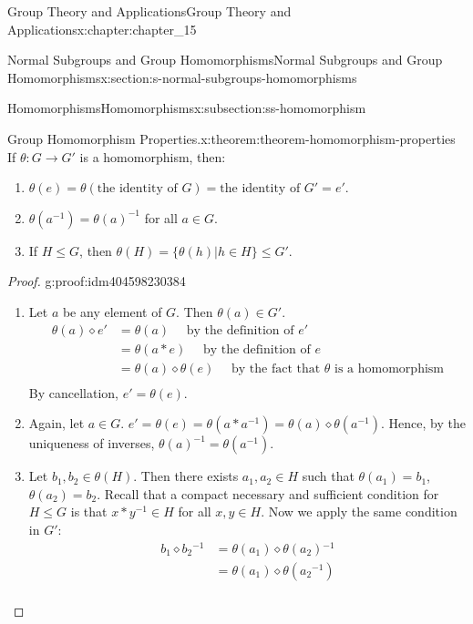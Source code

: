 \documentclass[twoside,10pt,]{book}
\numberwithin{equation}{section}
\begin{document}
\begin{chapterptx}{Group Theory and Applications}{}{Group Theory and Applications}{}{}{x:chapter:chapter_15}
\begin{sectionptx}{Normal Subgroups and Group Homomorphisms}{}{Normal Subgroups and Group Homomorphisms}{}{}{x:section:s-normal-subgroups-homomorphisms}
\begin{subsectionptx}{Homomorphisms}{}{Homomorphisms}{}{}{x:subsection:ss-homomorphism}
\begin{theorem}{Group Homomorphism Properties.}{}{x:theorem:theorem-homomorphism-properties}%
If \(\theta: G \rightarrow  G'\) is a homomorphism, then:%
\begin{enumerate}[label=(\alph*)]
\item{}\(\theta(e) =\theta(\textrm{the identity of } G) = \textrm{the identity of } G' = e'\).%
\item{}\(\theta\left(a ^{-1}\right) = \theta(a)^{-1}\) for all \(a \in  G\).%
\item{}If \(H \leq  G\), then \(\theta(H) = \{\theta(h) | h\in H\}\leq G'\).%
\end{enumerate}
%
\end{theorem}
\begin{proof}{}{g:proof:idm404598230384}
%
\begin{enumerate}[label=(\alph*)]
\item{}Let \(a\) be any element of \(G\). Then \(\theta(a) \in  G'\).%
\begin{equation*}
\begin{split}
\theta(a)\diamond e' &= \theta(a) \quad \textrm{     by the definition of } e'\\
&=\theta(a*e)\quad \textrm{     by the definition of } e\\
&= \theta(a)\diamond \theta(e)\quad \textrm{    by the fact that } \theta \textrm{ is a homomorphism}\\
\end{split}
\end{equation*}
By cancellation, \(e' = \theta(e)\).%
\item{}Again, let \(a \in G\). \(e' = \theta(e) = \theta\left(a*a^{-1} \right) = \theta(a)\diamond \theta\left(a^{-1}\right)\). Hence, by the uniqueness of inverses,  \(\theta(a) ^{-1}= \theta\left(a^{-1}\right)\).%
\item{}Let \(b_1, b_2 \in  \theta(H)\). Then there exists \(a_1, a_2\in H\) such that \(\theta\left(a_1\right) = b_1\), \(\theta\left(a_2\right) =
b_2\). Recall that a compact necessary and sufficient condition for \(H \leq  G\) is that \(x*y^{-1}\in H\)  for all \(x, y \in H\).  Now we apply the same condition in \(G'\):%
\begin{equation*}
\begin{split}
b_1\diamond b_2{}^{-1} &= \theta\left(a_1\right)\diamond \theta\left(a_2\right){}^{-1}\\
& =\theta\left(a_1\right)\diamond \theta\left(a_2{}^{-1}\right)\\

\end{split}
\end{equation*}
\end{enumerate}
\end{proof}
\end{subsectionptx}
\end{sectionptx}
\end{chapterptx}
\end{document}

